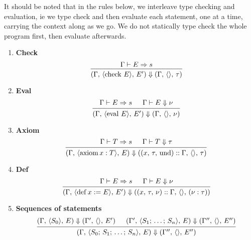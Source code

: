 \documentclass{article}
\begin{document}
It should be noted that in the rules below, we interleave type checking and 
evaluation, ie we type check and then evaluate each statement, one at a time,
carrying the context along as we go.
We do not statically type check the whole program first, then evaluate
afterwards.

\begin{enumerate}
\item \textbf{Check} \\
  \[
    \begin{prooftree}
      \hypo{\Gamma \vdash E \Rightarrow s}
      \infer1{(\Gamma, \, \langle \checkk \, E \rangle, \, E') \Downarrow
        (\Gamma, \, \langle \rangle, \, \tau)}
    \end{prooftree}
  \]

\item \textbf{Eval} \\
  \[
    \begin{prooftree}
      \hypo{\Gamma \vdash E \Rightarrow s}
      \hypo{\Gamma \vdash E \Downarrow \nu}
      \infer2{(\Gamma, \, \langle \evall \, E \rangle, \, E') \Downarrow
        (\Gamma, \, \langle \rangle, \, \nu)}
    \end{prooftree}
  \]

\item \textbf{Axiom} \\
  \[
    \begin{prooftree}
      \hypo{\Gamma \vdash T \Rightarrow s}
      \hypo{\Gamma \vdash T \Downarrow \tau}
      \infer2{(\Gamma, \, \langle \axiom x : T \rangle, \, E) \Downarrow
        ((x, \, \tau, \, \text{und}) :: \Gamma, \, \langle \rangle, \, \tau)}
    \end{prooftree}
  \]

\item \textbf{Def} \\
  \[
    \begin{prooftree}
      \hypo{\Gamma \vdash E \Rightarrow s}
      \hypo{\Gamma \vdash E \Downarrow \nu}
      \infer2{(\Gamma, \, \langle \deff x := E \rangle, \, E') \Downarrow
        ((x, \, \tau, \, \nu) :: \Gamma, \, \langle \rangle, \, (\nu : \tau))}
    \end{prooftree}
  \]

\item \textbf{Sequences of statements} \\
  \[
    \begin{prooftree}
      \hypo{(\Gamma, \, \langle S_0 \rangle, \, E) \Downarrow
        (\Gamma', \, \langle \rangle, \, E') }
      \hypo{(\Gamma', \, \langle S_1; \, \dots; \, S_n \rangle, \, E) \Downarrow
        (\Gamma'', \, \langle \rangle, \, E'') }
      \infer2{(\Gamma, \, \langle S_0; \, S_1; \, \dots; \, S_n \rangle, \, E) \Downarrow
        (\Gamma'', \, \langle \rangle, \, E'') }
    \end{prooftree}
  \]

\end{enumerate}
\end{document}
